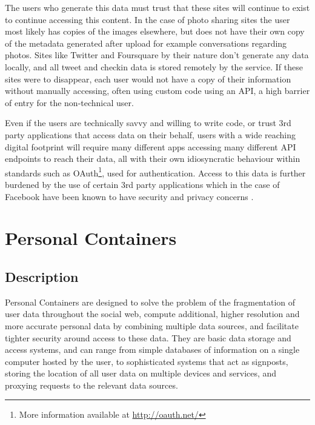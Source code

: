 \documentclass[11pt,a4paper,twoside]{article}
\begin{document}
The users who generate this data must trust that these sites will continue to exist to continue accessing this content. In the case of photo sharing sites the user most likely has copies of the images elsewhere, but does not have their own copy of the metadata generated after upload for example conversations regarding photos. Sites like Twitter and Foursquare by their nature don't generate any data locally, and all tweet and checkin data is stored remotely by the service. If these sites were to disappear, each user would not have a copy of their information without manually accessing, often using custom code using an API, a high barrier of entry for the non-technical user.

Even if the users are technically savvy and willing to write code, or trust 3rd party applications that access data on their behalf, users with a wide reaching digital footprint will require many different apps accessing many different API endpoints to reach their data, all with their own idiosyncratic behaviour within standards such as OAuth\footnote{More information available at \url{http://oauth.net/}}, used for authentication. Access to this data is further burdened by the use of certain 3rd party applications which in the case of Facebook have been known to have security and privacy concerns \cite{consumerist:sa} \cite{ZDnet:cs} \cite{wsj:sa} \cite{eff:sa}.




\newpage
\section{Personal Containers}

\subsection{Description}
Personal Containers are designed to solve the problem of the fragmentation of user data throughout the social web, compute additional, higher resolution and more accurate personal data by combining multiple data sources, and facilitate tighter security around access to these data. They are basic data storage and access systems, and can range from simple databases of information on a single computer hosted by the user, to sophisticated systems that act as signposts, storing the location of all user data on multiple devices and services, and proxying requests to the relevant data sources.
\end{document}
